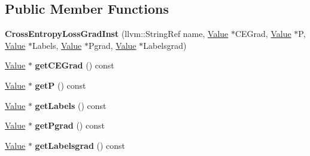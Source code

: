 \subsection*{Public Member Functions}
\begin{DoxyCompactItemize}
\item 
\mbox{\label{classglow_1_1_cross_entropy_loss_grad_inst_a4d44997de9c41a02a6c0d8f033737ade}} 
{\bfseries Cross\+Entropy\+Loss\+Grad\+Inst} (llvm\+::\+String\+Ref name, \hyperlink{classglow_1_1_value}{Value} $\ast$C\+E\+Grad, \hyperlink{classglow_1_1_value}{Value} $\ast$P, \hyperlink{classglow_1_1_value}{Value} $\ast$Labels, \hyperlink{classglow_1_1_value}{Value} $\ast$Pgrad, \hyperlink{classglow_1_1_value}{Value} $\ast$Labelsgrad)
\item 
\mbox{\label{classglow_1_1_cross_entropy_loss_grad_inst_a7d0bb323fd1e41b62ca696fcd6e8b4d6}} 
\hyperlink{classglow_1_1_value}{Value} $\ast$ {\bfseries get\+C\+E\+Grad} () const
\item 
\mbox{\label{classglow_1_1_cross_entropy_loss_grad_inst_a9994fea4188acfc2f1ff49c24b3a135c}} 
\hyperlink{classglow_1_1_value}{Value} $\ast$ {\bfseries getP} () const
\item 
\mbox{\label{classglow_1_1_cross_entropy_loss_grad_inst_af9645aaaca3643a19cf4a9808b770662}} 
\hyperlink{classglow_1_1_value}{Value} $\ast$ {\bfseries get\+Labels} () const
\item 
\mbox{\label{classglow_1_1_cross_entropy_loss_grad_inst_ab560326f1d7fab22daeb63a1973e5a15}} 
\hyperlink{classglow_1_1_value}{Value} $\ast$ {\bfseries get\+Pgrad} () const
\item 
\mbox{\label{classglow_1_1_cross_entropy_loss_grad_inst_afc401b0f37fac71d715ed61af05dd892}} 
\hyperlink{classglow_1_1_value}{Value} $\ast$ {\bfseries get\+Labelsgrad} () const
\item 
\mbox{\label{classglow_1_1_cross_entropy_loss_grad_inst_a91ca05b039838b885c4b798c94d8e714}} 

\end{DoxyCompactItemize}
